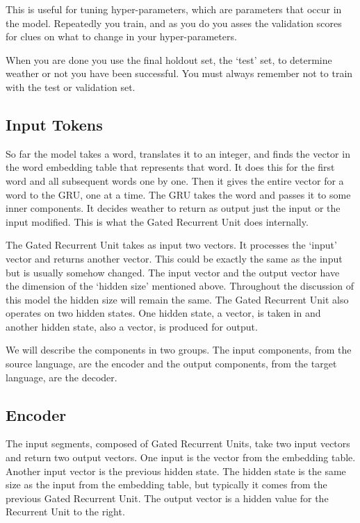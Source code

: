 This is useful for tuning hyper-parameters, which are parameters that occur in the model. Repeatedly you train, and as you do you asses the validation scores for clues on what to change in your hyper-parameters. 

When you are done you use the final holdout set, the `test' set, to determine weather or not you have been successful. You must always remember not to train with the test or validation set.

\subsection{Input Tokens}

So far the model takes a word, translates it to an integer, and finds the vector in the word embedding table that represents that word. It does this for the first word and all subsequent words one by one. Then it gives the entire vector for a word to the GRU, one at a time. The GRU takes the word and passes it to some inner components. It decides weather to return as output just the input or the input modified. This is what the Gated Recurrent Unit does internally.

The Gated Recurrent Unit takes as input two vectors. It processes the `input' vector and returns another vector. This could be exactly the same as the input but is usually somehow changed. The input vector and the output vector have the dimension of the `hidden size' mentioned above. Throughout the discussion of this model the hidden size will remain the same. The Gated Recurrent Unit also operates on two hidden states. One hidden state, a vector, is taken in and another hidden state, also a vector, is produced for output.

We will describe the components in two groups. The input components, from the source language, are the encoder and the output components, from the target language, are the decoder.



\subsection{Encoder}

The input segments, composed of Gated Recurrent Units, take two input vectors and return two output vectors. One input is the vector from the embedding table. Another input vector is the previous hidden state. The hidden state is the same size as the input from the embedding table, but typically it comes from the previous Gated Recurrent Unit. The output vector is a hidden value for the Recurrent Unit to the right.

